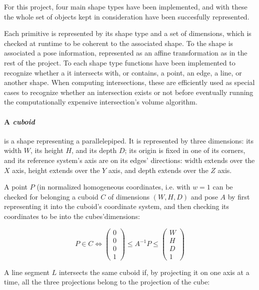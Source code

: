 For this project, four main shape types have been implemented, and with these
the whole set of objects kept in consideration have been succesfully
represented.

Each primitive is represented by its shape type and a set of dimensions, which
is checked at runtime to be coherent to the associated shape. To the shape is
associated a pose information, represented as an affine transformation as in the
rest of the project. To each shape type functions have been implemented to
recognize whether a it intersects with, or contains, a point, an edge, a line, or
another shape. When computing intersections, these are efficiently used as
special cases to recognize whether an intersection exists or not before
eventually running the computationally expensive intersection's volume
algorithm.

\paragraph{A \emph{cuboid}} is a shape representing a parallelepiped. It is represented by
three dimensions: its width $W$, its height $H$, and its depth $D$; its origin is fixed in one
of its corners, and its reference system's axis are on its edges' directions:
width extends over the $X$ axis, height extends over the $Y$ axis, and depth
extends over the $Z$ axis.

A point $P$ (in normalized homogeneous coordinates, i.e. with $w=1$  can be checked for belonging a cuboid $C$ of dimensions $(W,H,D)$ and
pose $A$ by first representing it into
the cuboid's coordinate system, and then checking its coordinates to be into the
cubes'dimensions:

\begin{equation}
P \in C \Leftrightarrow \begin{pmatrix}0\\0\\0\\1\end{pmatrix} \leq A^{-1}P \leq
\begin{pmatrix}W\\H\\D\\1\end{pmatrix}
\end{equation}
  
A line segment $L$ intersects the same cuboid if, by projecting it on one axis at a time,
all the three projections belong to the projection of the cube:

